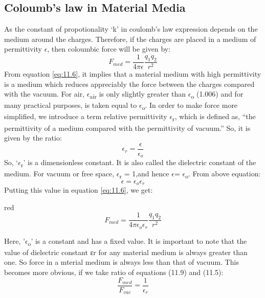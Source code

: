 \subsection{Coloumb’s law in Material Media}
As the constant of propotionality ‘k’ in coulomb’s law expression depends on the medium
around the charges. Therefore, if the charges are placed in a medium
of permittivity $\epsilon$, then coloumbic force will be given by:
\begin{equation}\label{eq:11.6}
  F_{med} = \frac{1}{4\pi\epsilon} \frac{q_{1}q_{2}}{r^{2}}
\end{equation}
From equation \ref{eq:11.6}, it implies that a material medium
with high permittivity is a medium which reduces appreciably
the force between the charges compared with the vacuum. For air, $\epsilon$\textsubscript{air}
is only slightly greater than $\epsilon$\textsubscript{o} (1.006) and for many practical purposes,
is taken equal to $\epsilon$\textsubscript{o}.
In order to make force more simplified, we introduce a term relative permittivity $\epsilon$\textsubscript{r},
which is defined as, “the permittivity of a medium compared with the permittivity of vacuum.” So,
it is given by the ratio:
\begin{equation}\label{eq:11.7}
  \epsilon_{r} = \frac{\epsilon}{\epsilon_{o}}
\end{equation}
So, ‘$\epsilon$\textsubscript{r}’ is a dimensionless constant.
It is also called the dielectric constant of the medium.
For vacuum or free space, $\epsilon$\textsubscript{r} = 1,and hence $\epsilon$= $\epsilon$\textsubscript{o}.
From above equation:
\begin{equation}\label{eq:11.8}
  \epsilon = \epsilon_{o}\epsilon_{r}
\end{equation}
Putting this value in equation \ref{eq:11.6}, we get:
\begin{mybox}{red}{}
\begin{equation}\label{eq:11.9}
  F_{med} = \frac{1}{4\pi\epsilon_{o}\epsilon_{r}} \frac{q_{1}q_{2}}{r^{2}}
\end{equation}
\end{mybox}
Here, '$\epsilon$\textsubscript{o}' is a constant and has a fixed value.
It is important to note that the value of dielectric constant εr for any material
medium is always greater than one. So force in a mterial medium
is always less than that of vacuum. This becomes more obvious,
if we take ratio of equations (11.9) and (11.5):
\begin{equation}\label{eq:11.10}
  \frac{F_{med}}{F_{vac}} = \frac{1}{\epsilon_{r}}
\end{equation}

